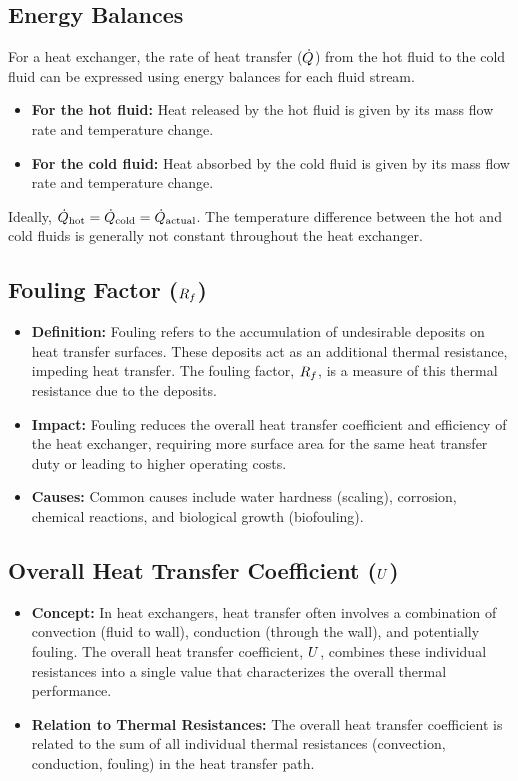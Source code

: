 \subsection{Energy Balances}
For a heat exchanger, the rate of heat transfer ($\dot{Q}$) from the hot fluid to the cold fluid can be expressed using energy balances for each fluid stream.
\begin{itemize}
    \item \textbf{For the hot fluid:} Heat released by the hot fluid is given by its mass flow rate and temperature change.
    \item \textbf{For the cold fluid:} Heat absorbed by the cold fluid is given by its mass flow rate and temperature change.
\end{itemize}
Ideally, $\dot{Q}_{\text{hot}} = \dot{Q}_{\text{cold}} = \dot{Q}_{\text{actual}}$.
The temperature difference between the hot and cold fluids is generally not constant throughout the heat exchanger.

\subsection{Fouling Factor ($R_f$)}
\begin{itemize}
    \item \textbf{Definition:} Fouling refers to the accumulation of undesirable deposits on heat transfer surfaces. These deposits act as an additional thermal resistance, impeding heat transfer. The fouling factor, $R_f$, is a measure of this thermal resistance due to the deposits.
    \item \textbf{Impact:} Fouling reduces the overall heat transfer coefficient and efficiency of the heat exchanger, requiring more surface area for the same heat transfer duty or leading to higher operating costs.
    \item \textbf{Causes:} Common causes include water hardness (scaling), corrosion, chemical reactions, and biological growth (biofouling).
\end{itemize}

\subsection{Overall Heat Transfer Coefficient ($U$)}
\begin{itemize}
    \item \textbf{Concept:} In heat exchangers, heat transfer often involves a combination of convection (fluid to wall), conduction (through the wall), and potentially fouling. The overall heat transfer coefficient, $U$, combines these individual resistances into a single value that characterizes the overall thermal performance.
    \item \textbf{Relation to Thermal Resistances:} The overall heat transfer coefficient is related to the sum of all individual thermal resistances (convection, conduction, fouling) in the heat transfer path.
\end{itemize}

